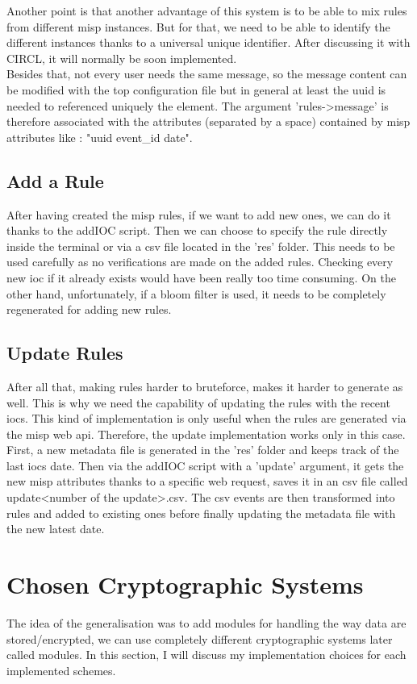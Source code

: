 \documentclass{eplmastersthesis}
\begin{document}
Another point is that another advantage of this system is to be able to mix rules from different \gls{misp} instances. But for that, we need to be able to identify the different instances thanks to a universal unique identifier. After discussing it with CIRCL, it will normally be soon implemented.\\

Besides that, not every user needs the same message, so the message content can be modified with the top configuration file but in general at least the \gls{uuid} is needed to referenced uniquely the element.
The argument 'rules->message' is therefore associated with the attributes (separated by a space) contained by \gls{misp} attributes like : "uuid event\_id date".

\subsection{Add a Rule}
After having created the \gls{misp} rules, if we want to add new ones, we can do it thanks to the addIOC script.
Then we can choose to specify the rule directly inside the terminal or via a \gls{csv} file located in the 'res' folder.
This needs to be used carefully as no verifications are made on the added rules. Checking every new \gls{ioc} if it already exists would have been really too time consuming.
On the other hand, unfortunately, if a bloom filter is used, it needs to be completely regenerated for adding new rules.

\subsection{Update Rules}
After all that, making rules harder to bruteforce, makes it harder to generate as well. This is why we need the capability of updating the rules with the recent \gls{ioc}s.
This kind of implementation is only useful when the rules are generated via the \gls{misp} web \gls{api}. Therefore, the update implementation works only in this case.
First, a new metadata file is generated in the 'res' folder and keeps track of the last \gls{ioc}s date. Then via the addIOC script with a '\-\-update' argument, it gets the new \gls{misp} attributes thanks to a specific web request, saves it in an \gls{csv} file called update<number of the update>.csv.
The \gls{csv} events are then transformed into rules and added to existing ones before finally updating the metadata file with the new latest date.

\section{Chosen Cryptographic Systems}
The idea of the generalisation was to add modules for handling the way data are stored/encrypted, we can use completely different cryptographic systems later called modules. In this section, I will discuss my implementation choices for each implemented schemes.
\end{document}
